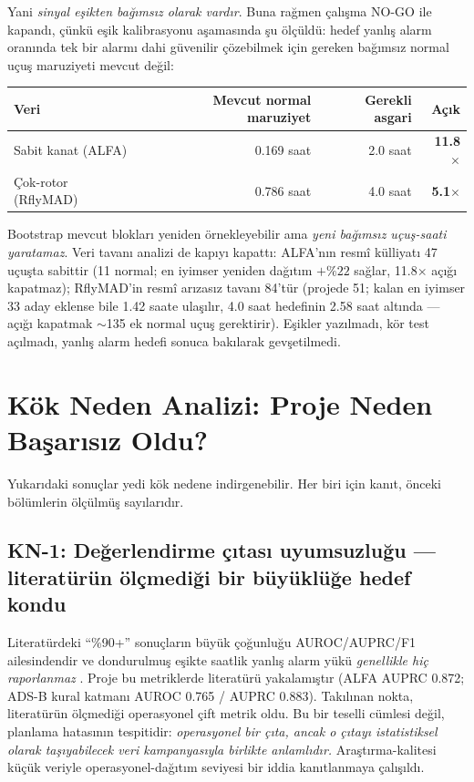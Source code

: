 \documentclass[11pt,a4paper]{article}
\begin{document}
Yani \emph{sinyal eşikten bağımsız olarak vardır}. Buna rağmen çalışma NO-GO
ile kapandı, çünkü eşik kalibrasyonu aşamasında şu ölçüldü: hedef yanlış alarm
oranında tek bir alarmı dahi güvenilir çözebilmek için gereken bağımsız normal
uçuş maruziyeti mevcut değil:

\begin{center}
\small
\begin{tabular}{lrrr}
\toprule
Veri & Mevcut normal maruziyet & Gerekli asgari & Açık \\
\midrule
Sabit kanat (ALFA) & 0.169 saat & 2.0 saat & \textbf{11.8$\times$} \\
Çok-rotor (RflyMAD) & 0.786 saat & 4.0 saat & \textbf{5.1$\times$} \\
\bottomrule
\end{tabular}
\end{center}

Bootstrap mevcut blokları yeniden örnekleyebilir ama \emph{yeni bağımsız
uçuş-saati yaratamaz}. Veri tavanı analizi de kapıyı kapattı: ALFA'nın resmî
külliyatı 47 uçuşta sabittir (11 normal; en iyimser yeniden dağıtım $+\%22$
sağlar, 11.8$\times$ açığı kapatmaz); RflyMAD'in resmî arızasız tavanı 84'tür
(projede 51; kalan en iyimser 33 aday eklense bile 1.42 saate ulaşılır, 4.0
saat hedefinin 2.58 saat altında --- açığı kapatmak $\sim$135 ek normal uçuş
gerektirir). Eşikler yazılmadı, kör test açılmadı, yanlış alarm hedefi sonuca
bakılarak gevşetilmedi.

\section{Kök Neden Analizi: Proje Neden Başarısız Oldu?}
\label{sec:kokneden}

Yukarıdaki sonuçlar yedi kök nedene indirgenebilir. Her biri için kanıt,
önceki bölümlerin ölçülmüş sayılarıdır.

\subsection{KN-1: Değerlendirme çıtası uyumsuzluğu --- literatürün ölçmediği
bir büyüklüğe hedef kondu}

Literatürdeki ``\%90+'' sonuçların büyük çoğunluğu AUROC/AUPRC/F1 ailesindendir
ve dondurulmuş eşikte saatlik yanlış alarm yükü \emph{genellikle hiç
raporlanmaz} \cite{wu2021flawed,kim2022rigorous}. Proje bu metriklerde
literatürü yakalamıştır (ALFA AUPRC 0.872; ADS-B kural katmanı AUROC 0.765 /
AUPRC 0.883). Takılınan nokta, literatürün ölçmediği operasyonel çift metrik
oldu. Bu bir teselli cümlesi değil, planlama hatasının tespitidir:
\emph{operasyonel bir çıta, ancak o çıtayı istatistiksel olarak taşıyabilecek
veri kampanyasıyla birlikte anlamlıdır.} Araştırma-kalitesi küçük veriyle
operasyonel-dağıtım seviyesi bir iddia kanıtlanmaya çalışıldı.
\end{document}
